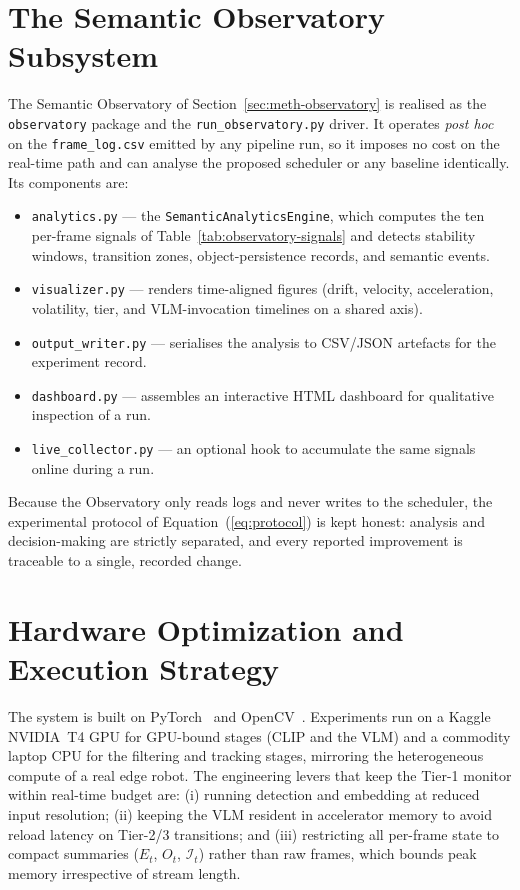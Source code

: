 \section{The Semantic Observatory Subsystem}
\label{sec:arch-observatory}

The Semantic Observatory of Section~\ref{sec:meth-observatory} is realised as
the \texttt{observatory} package and the \texttt{run\_observatory.py} driver.
It operates \emph{post hoc} on the \texttt{frame\_log.csv} emitted by any
pipeline run, so it imposes no cost on the real-time path and can analyse the
proposed scheduler or any baseline identically. Its components are:

\begin{itemize}
  \item \texttt{analytics.py} --- the \texttt{SemanticAnalyticsEngine}, which
  computes the ten per-frame signals of
  Table~\ref{tab:observatory-signals} and detects stability windows,
  transition zones, object-persistence records, and semantic events.
  \item \texttt{visualizer.py} --- renders time-aligned figures (drift,
  velocity, acceleration, volatility, tier, and VLM-invocation timelines on a
  shared axis).
  \item \texttt{output\_writer.py} --- serialises the analysis to CSV/JSON
  artefacts for the experiment record.
  \item \texttt{dashboard.py} --- assembles an interactive HTML dashboard for
  qualitative inspection of a run.
  \item \texttt{live\_collector.py} --- an optional hook to accumulate the same
  signals online during a run.
\end{itemize}

Because the Observatory only reads logs and never writes to the scheduler, the
experimental protocol of Equation~(\ref{eq:protocol}) is kept honest: analysis
and decision-making are strictly separated, and every reported improvement is
traceable to a single, recorded change.

\section{Hardware Optimization and Execution Strategy}
\label{sec:arch-hardware}

The system is built on PyTorch~\cite{Paszke2019PyTorch} and
OpenCV~\cite{Bradski2000OpenCV}. Experiments run on a Kaggle NVIDIA~T4 GPU for
GPU-bound stages (CLIP and the VLM) and a commodity laptop CPU for the
filtering and tracking stages, mirroring the heterogeneous compute of a real
edge robot. The engineering levers that keep the Tier-1 monitor within
real-time budget are: (i) running detection and embedding at reduced input
resolution; (ii) keeping the VLM resident in accelerator memory to avoid
reload latency on Tier-2/3 transitions; and (iii) restricting all per-frame
state to compact summaries ($E_t$, $O_t$, $\mathcal{I}_t$) rather than raw
frames, which bounds peak memory irrespective of stream length.
